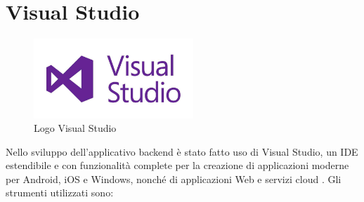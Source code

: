 \pagebreak
\section{Visual Studio}
\begin{figure}[ht!]
\begin{center}
  \includegraphics[width=6cm]{images/logoVS.jpeg}
  \caption{Logo Visual Studio}
\end{center}
\end{figure}
Nello sviluppo dell'applicativo backend è stato fatto uso di Visual Studio, un IDE estendibile e con funzionalità complete per la creazione di applicazioni moderne per Android, iOS e Windows, nonché di applicazioni Web e servizi cloud \cite{VS}. Gli strumenti utilizzati sono:

